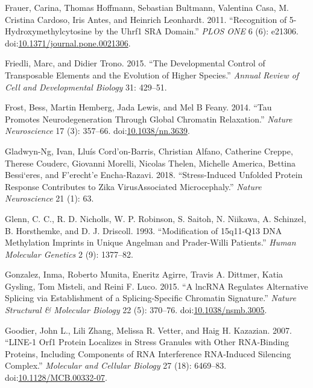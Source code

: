 \documentclass[onehalf,12pt]{beavtex}
\begin{document}
  \hypertarget{ref-FrauerRecognition5HydroxymethylcytosineUhrf12011}{}
  Frauer, Carina, Thomas Hoffmann, Sebastian Bultmann, Valentina Casa, M.
  Cristina Cardoso, Iris Antes, and Heinrich Leonhardt. 2011.
  ``Recognition of 5-Hydroxymethylcytosine by the Uhrf1 SRA Domain.''
  \emph{PLOS ONE} 6 (6): e21306.
  doi:\href{https://doi.org/10.1371/journal.pone.0021306}{10.1371/journal.pone.0021306}.
  
  \hypertarget{ref-Friedlidevelopmentalcontroltransposable2015}{}
  Friedli, Marc, and Didier Trono. 2015. ``The Developmental Control of
  Transposable Elements and the Evolution of Higher Species.''
  \emph{Annual Review of Cell and Developmental Biology} 31: 429--51.
  
  \hypertarget{ref-FrostTaupromotesneurodegeneration2014}{}
  Frost, Bess, Martin Hemberg, Jada Lewis, and Mel B Feany. 2014. ``Tau
  Promotes Neurodegeneration Through Global Chromatin Relaxation.''
  \emph{Nature Neuroscience} 17 (3): 357--66.
  doi:\href{https://doi.org/10.1038/nn.3639}{10.1038/nn.3639}.
  
  \hypertarget{ref-Gladwyn-NgStressinducedunfoldedprotein2018}{}
  Gladwyn-Ng, Ivan, Lluís Cord\a'on-Barris, Christian Alfano, Catherine
  Creppe, Therese Couderc, Giovanni Morelli, Nicolas Thelen, Michelle
  America, Bettina Bessi\a`eres, and F\a'erecht\a'e Encha-Razavi. 2018.
  ``Stress-Induced Unfolded Protein Response Contributes to Zika
  VirusAssociated Microcephaly.'' \emph{Nature Neuroscience} 21 (1): 63.
  
  \hypertarget{ref-GlennModification15q11q13DNA1993}{}
  Glenn, C. C., R. D. Nicholls, W. P. Robinson, S. Saitoh, N. Niikawa, A.
  Schinzel, B. Horsthemke, and D. J. Driscoll. 1993. ``Modification of
  15q11-Q13 DNA Methylation Imprints in Unique Angelman and Prader-Willi
  Patients.'' \emph{Human Molecular Genetics} 2 (9): 1377--82.
  
  \hypertarget{ref-GonzalezlncRNAregulatesalternative2015}{}
  Gonzalez, Inma, Roberto Munita, Eneritz Agirre, Travis A. Dittmer, Katia
  Gysling, Tom Misteli, and Reini F. Luco. 2015. ``A lncRNA Regulates
  Alternative Splicing via Establishment of a Splicing-Specific Chromatin
  Signature.'' \emph{Nature Structural \& Molecular Biology} 22 (5):
  370--76.
  doi:\href{https://doi.org/10.1038/nsmb.3005}{10.1038/nsmb.3005}.
  
  \hypertarget{ref-GoodierLINE1ORF1Protein2007}{}
  Goodier, John L., Lili Zhang, Melissa R. Vetter, and Haig H. Kazazian.
  2007. ``LINE-1 Orf1 Protein Localizes in Stress Granules with Other
  RNA-Binding Proteins, Including Components of RNA Interference
  RNA-Induced Silencing Complex.'' \emph{Molecular and Cellular Biology}
  27 (18): 6469--83.
  doi:\href{https://doi.org/10.1128/MCB.00332-07}{10.1128/MCB.00332-07}.
  
\end{document}
